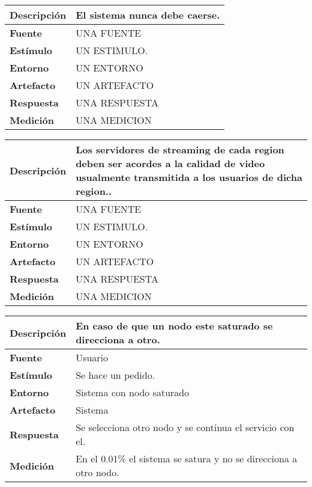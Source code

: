 \begin{center}
  \begin{tabular}{| l | p{10cm} | }
    \hline
  \textbf{Descripción} & El sistema nunca debe caerse.\\  \hline
  \textbf{Fuente} & UNA FUENTE\\  \hline
  \textbf{Estímulo} & UN ESTIMULO.\\  \hline
  \textbf{Entorno} & UN ENTORNO\\  \hline
  \textbf{Artefacto} & UN ARTEFACTO\\  \hline
  \textbf{Respuesta} & UNA RESPUESTA\\  \hline
  \textbf{Medición} & UNA MEDICION\\  \hline
  \end{tabular}
\end{center} 

\begin{center}
  \begin{tabular}{| l | p{10cm} | }
    \hline
  \textbf{Descripción} & Los servidores de streaming de cada region deben ser acordes a la calidad de video usualmente transmitida a los usuarios de dicha region..\\  \hline
  \textbf{Fuente} & UNA FUENTE\\  \hline
  \textbf{Estímulo} & UN ESTIMULO.\\  \hline
  \textbf{Entorno} & UN ENTORNO\\  \hline
  \textbf{Artefacto} & UN ARTEFACTO\\  \hline
  \textbf{Respuesta} & UNA RESPUESTA\\  \hline
  \textbf{Medición} & UNA MEDICION\\  \hline
  \end{tabular}
\end{center} 


\begin{center}
  \begin{tabular}{| l | p{10cm} | }
    \hline
  \textbf{Descripción} & En caso de que un nodo este saturado se direcciona a otro.\\  \hline
  \textbf{Fuente} & Usuario\\  \hline
  \textbf{Estímulo} & Se hace un pedido.\\  \hline
  \textbf{Entorno} & Sistema con nodo saturado\\  \hline
  \textbf{Artefacto} & Sistema\\  \hline
  \textbf{Respuesta} & Se selecciona otro nodo y se continua el servicio con el.\\  \hline
  \textbf{Medición} & En el 0.01\% el sistema se satura y no se direcciona a otro nodo.\\  \hline
  \end{tabular}
\end{center} 

